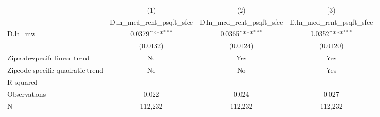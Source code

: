 {
\def\sym#1{\ifmmode^{#1}\else\(^{#1}\)\fi}
\begin{tabular}{l*{3}{c}}
\hline\hline
          &\multicolumn{1}{c}{(1)}&\multicolumn{1}{c}{(2)}&\multicolumn{1}{c}{(3)}\\
          &\multicolumn{1}{c}{D.ln\_med\_rent\_psqft\_sfcc}&\multicolumn{1}{c}{D.ln\_med\_rent\_psqft\_sfcc}&\multicolumn{1}{c}{D.ln\_med\_rent\_psqft\_sfcc}\\
\hline
D.ln\_mw   &   0.0379\sym{***}&   0.0365\sym{***}&   0.0352\sym{***}\\
          & (0.0132)         & (0.0124)         & (0.0120)         \\
\hline
Zipcode-specifc linear trend&       No         &      Yes         &      Yes         \\
Zipcode-specific quadratic trend&       No         &       No         &      Yes         \\
R-squared &                  &                  &                  \\
Observations&    0.022         &    0.024         &    0.027         \\
N         &  112,232         &  112,232         &  112,232         \\
\hline\hline
\end{tabular}
}
